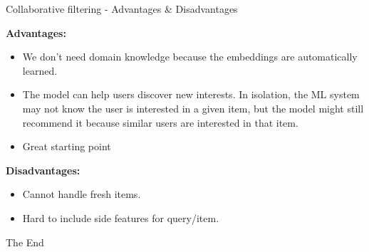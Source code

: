 \documentclass{beamer}
\newcommand\myheading[1]{%
  \par\bigskip
  {\large\bfseries#1}\par\smallskip}
\begin{document}
\begin{frame}{Collaborative filtering - Advantages \& Disadvantages}
	\begin{flushleft}
		\myheading{Advantages:}
		\begin{itemize}
			\item We don't need domain knowledge because the embeddings are automatically learned.
			\item The model can help users discover new interests. In isolation, the ML system may not know the user is interested in a given item, but the model might still recommend it because similar users are interested in that item.
			\item Great starting point
		\end{itemize}
		\myheading{Disadvantages:}
		\begin{itemize}
			\item Cannot handle fresh items.
			\item Hard to include side features for query/item.
		\end{itemize}
	\end{flushleft}
\end{frame}

\begin{frame}
\huge{\centerline{The End}}
\end{frame}
\end{document}
